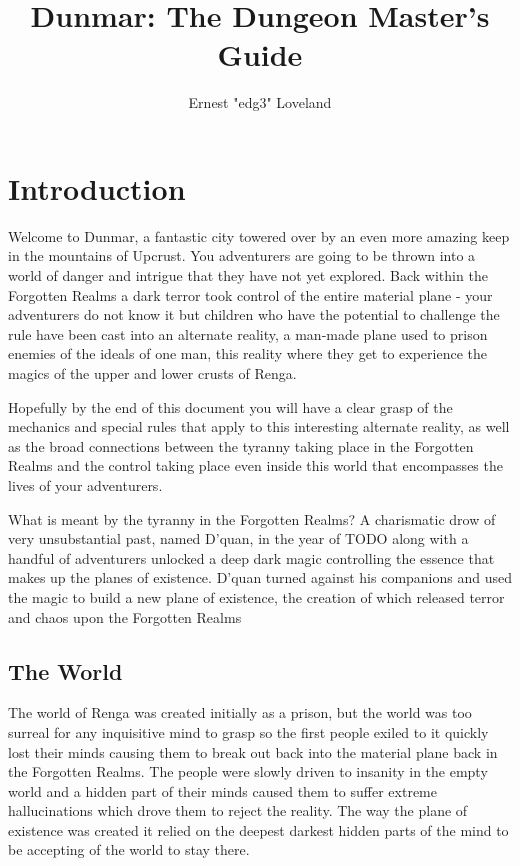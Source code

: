\documentclass[10pt,twoside,twocolumn]{article}
\title{Dunmar: The Dungeon Master's Guide}
\author{Ernest "edg3" Loveland}
\begin{document}
\selectfont %


\section{Introduction}

Welcome to Dunmar, a fantastic city towered over by an even more amazing keep in the mountains of Upcrust. You adventurers are going to be thrown into a world of danger and intrigue that they have not yet explored. Back within the Forgotten Realms a dark terror took control of the entire material plane - your adventurers do not know it but children who have the potential to challenge the rule have been cast into an alternate reality, a man-made plane used to prison enemies of the ideals of one man, this reality where they get to experience the magics of the upper and lower crusts of Renga.

Hopefully by the end of this document you will have a clear grasp of the mechanics and special rules that apply to this interesting alternate reality, as well as the broad connections between the tyranny taking place in the Forgotten Realms and the control taking place even inside this world that encompasses the lives of your adventurers.

\begin{paperbox}{What is meant by the tyranny in the Forgotten Realms?}
A charismatic drow of very unsubstantial past, named D'quan, in the year of TODO along with a handful of adventurers unlocked a deep dark magic controlling the essence that makes up the planes of existence. D'quan turned against his companions and used the magic to build a new plane of existence, the creation of which released terror and chaos upon the Forgotten Realms
\end{paperbox}

\subsection{The World}
The world of Renga was created initially as a prison, but the world was too surreal for any inquisitive mind to grasp so the first people exiled to it quickly lost their minds causing them to break out back into the material plane back in the Forgotten Realms. The people were slowly driven to insanity in the empty world and a hidden part of their minds caused them to suffer extreme hallucinations which drove them to reject the reality. The way the plane of existence was created it relied on the deepest darkest hidden parts of the mind to be accepting of the world to stay there.
\end{document}
